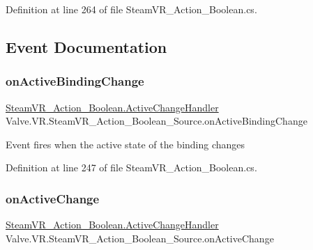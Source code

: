 Definition at line 264 of file Steam\+V\+R\+\_\+\+Action\+\_\+\+Boolean.\+cs.



\subsection{Event Documentation}
\mbox{\label{class_valve_1_1_v_r_1_1_steam_v_r___action___boolean___source_a39d21e4fc6f670f9289b2acd0c2c2bf3}} 
\subsubsection{\texorpdfstring{onActiveBindingChange}{onActiveBindingChange}}
{\footnotesize\ttfamily \mbox{\hyperlink{class_valve_1_1_v_r_1_1_steam_v_r___action___boolean_af9f3044d5e4868485945b70d907c6bbb}{Steam\+V\+R\+\_\+\+Action\+\_\+\+Boolean.\+Active\+Change\+Handler}} Valve.\+V\+R.\+Steam\+V\+R\+\_\+\+Action\+\_\+\+Boolean\+\_\+\+Source.\+on\+Active\+Binding\+Change}



Event fires when the active state of the binding changes 



Definition at line 247 of file Steam\+V\+R\+\_\+\+Action\+\_\+\+Boolean.\+cs.

\mbox{\label{class_valve_1_1_v_r_1_1_steam_v_r___action___boolean___source_a89f4c615f6cc510d0bf7326218d85759}} 
\subsubsection{\texorpdfstring{onActiveChange}{onActiveChange}}
{\footnotesize\ttfamily \mbox{\hyperlink{class_valve_1_1_v_r_1_1_steam_v_r___action___boolean_af9f3044d5e4868485945b70d907c6bbb}{Steam\+V\+R\+\_\+\+Action\+\_\+\+Boolean.\+Active\+Change\+Handler}} Valve.\+V\+R.\+Steam\+V\+R\+\_\+\+Action\+\_\+\+Boolean\+\_\+\+Source.\+on\+Active\+Change}



